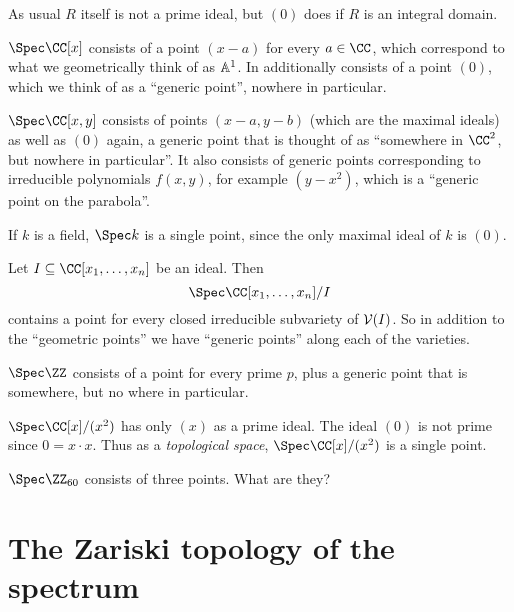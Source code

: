 \documentclass[11pt]{scrreprt}
\begin{document}
\begin{remark}
	As usual $R$ itself is not a prime ideal, but $(0)$
	does if $R$ is an integral domain.
\end{remark}

\begin{example}
	\listhack
	\begin{enumerate}[(a)]
		\ii $\Spec \CC[x]$ consists of a point $(x-a)$ for every $a \in \CC$,
		which correspond to what we geometrically think of as $\mathbb A^1$.
		In additionally consists of a point $(0)$,
		which we think of as a ``generic point'', nowhere in particular.

		\ii $\Spec \CC[x,y]$ consists of points $(x-a,y-b)$
		(which are the maximal ideals) as well as $(0)$ again, a generic
		point that is thought of as ``somewhere in $\CC^2$,
		but nowhere in particular''.
		It also consists of generic points corresponding to irreducible
		polynomials $f(x,y)$, for example $(y-x^2)$,
		which is a ``generic point on the parabola''.

		\ii If $k$ is a field, $\Spec k$ is a single point,
		since the only maximal ideal of $k$ is $(0)$.
	\end{enumerate}
\end{example}
\begin{example}
	Let $I \subseteq \CC[x_1, \dots, x_n]$ be an ideal.
	Then \[ \Spec \CC[x_1, \dots, x_n] /I \] contains a
	point for every closed irreducible subvariety of $\mathcal V(I)$.
	So in addition to the ``geometric points'' we have
	``generic points'' along each of the varieties.
\end{example}
\begin{example}
	\listhack
	\begin{enumerate}[(a)]
		\ii $\Spec \ZZ$ consists of a point for every prime $p$,
		plus a generic point that is somewhere, but no where in particular.

		\ii $\Spec \CC[x] / (x^2)$ has only $(x)$ as a prime ideal.
		The ideal $(0)$ is not prime since $0 = x \cdot x$.
		Thus as a \emph{topological space},
		$\Spec \CC[x] / (x^2)$ is a single point.
		
		\ii $\Spec \Zc{60}$ consists of three points.
		What are they?
	\end{enumerate}
\end{example}

\section{The Zariski topology of the spectrum}
\end{document}
